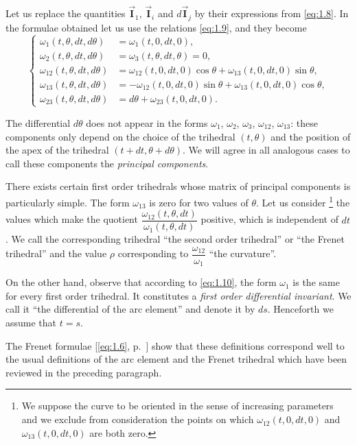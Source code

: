 \documentclass[leqno,11pt]{book}
\numberwithin{equation}{chapter}
\theoremstyle{shape1}
\theoremstyle{shapesmall}
\newcommand{\rvec}[1]{\vec{\mathbf{#1}}}
\newcommand{\ivec}{\rvec{I}}
\begin{document}
Let us replace the quantities $\ivec_{1}$, $\ivec_{i}$ and $d\ivec_{j}$ by their expressions from \eqref{eq:1.8}. In the formulae obtained let us use the relations \eqref{eq:1.9}, and they become
\begin{equation}
  \label{eq:1.10}
  \left\{
    \begin{aligned}
      \omega_{1}(t,\theta,dt,d\theta)&=\omega_{1}(t,0,dt,0),\\
      \omega_{2}(t,\theta,dt,d\theta)&=\omega_{3}(t,\theta,dt,\theta)=0,\\
      \omega_{12}(t,\theta,dt,d\theta)&=\omega_{12}(t,0,dt,0)\cos\theta+\omega_{13}(t,0,dt,0)\sin\theta,\\
      \omega_{13}(t,\theta,dt,d\theta)&=-\omega_{12}(t,0,dt,0)\sin\theta+\omega_{13}(t,0,dt,0)\cos\theta,\\
      \omega_{23}(t,\theta,dt,d\theta)&=d\theta+\omega_{23}(t,0,dt,0).
    \end{aligned}
  \right.
\end{equation}

The differential $d\theta$ does not appear in the forms $\omega_{1}$, $\omega_{2}$, $\omega_{3}$, $\omega_{12}$, $\omega_{13}$: these components only depend on the choice of the trihedral $(t,\theta)$ and the position of the apex of the trihedral $(t+dt,\theta+d\theta)$. We will agree in all analogous cases to call these components the \emph{principal components}.

There exists certain first order trihedrals whose matrix of principal components is particularly simple. The form $\omega_{13}$ is zero for two values of $\theta$. Let us consider \footnote{We suppose the curve to be oriented in the sense of increasing parameters and we exclude from consideration the points on which $\omega_{12}(t,0,dt,0)$ and $\omega_{13}(t,0,dt,0)$ are both zero.} the values which make the quotient $\dfrac{\omega_{12}(t,\theta,dt)}{\omega_{1}(t,\theta,dt)}$ positive, which is independent of $dt$. We call the corresponding trihedral ``the second order trihedral'' or ``the Frenet trihedral'' and the value $\rho$ corresponding to $\dfrac{\omega_{12}}{\omega_{1}}$ ``the curvature''.

On the other hand, observe that according to \eqref{eq:1.10}, the form $\omega_{1}$ is the same for every first order trihedral. It constitutes a \emph{first order differential invariant}. We call it ``the differential of the arc element'' and denote it by $ds$. Henceforth we assume that $t=s$.

The Frenet formulae [\eqref{eq:1.6}, p.~\pageref{eq:1.6}] show that these definitions correspond well to the usual definitions of the arc element and the Frenet trihedral which have been reviewed in the preceding paragraph.
\end{document}
